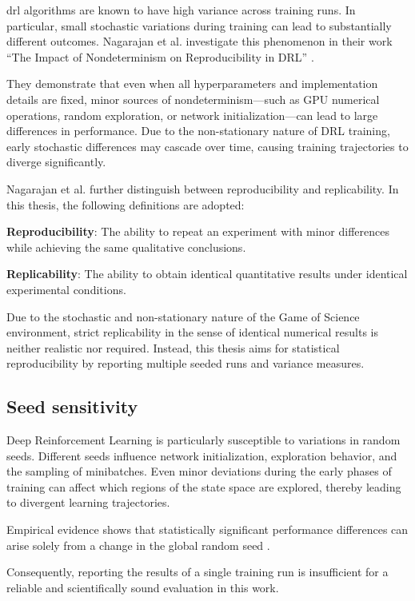 \documentclass[english,bachelor]{hsluthesis}
\begin{document}
\gls{drl} algorithms are known to have high variance across training runs. 
In particular, small stochastic variations during training can lead to substantially different outcomes. 
Nagarajan et al. investigate this phenomenon in their work “The Impact of Nondeterminism on Reproducibility in DRL” \cite{Nagarajan2018TheIO}. 

They demonstrate that even when all hyperparameters and implementation details are fixed, 
minor sources of nondeterminism—such as GPU numerical operations, random exploration, or network initialization—can lead to large differences in performance. 
Due to the non-stationary nature of DRL training, early stochastic differences may cascade over time, causing training trajectories to diverge significantly.

Nagarajan et al. further distinguish between reproducibility and replicability. 
In this thesis, the following definitions are adopted:

\textbf{Reproducibility}: The ability to repeat an experiment with minor differences while achieving the same qualitative conclusions.

\textbf{Replicability}: The ability to obtain identical quantitative results under identical experimental conditions.

Due to the stochastic and non-stationary nature of the Game of Science environment, strict replicability in the sense of identical numerical results is neither realistic nor required. Instead, this thesis aims for statistical reproducibility by reporting multiple seeded runs 
and variance measures.

\subsection{Seed sensitivity}

Deep Reinforcement Learning is particularly susceptible to variations in random seeds. 
Different seeds influence network initialization, exploration behavior, and the sampling of minibatches. 
Even minor deviations during the early phases of training can affect which regions of the state space are explored, thereby leading to divergent learning trajectories.

Empirical evidence shows that statistically significant performance differences can arise solely from a change in the global random seed \cite{Nagarajan2018TheIO}.

Consequently, reporting the results of a single training run is insufficient for a reliable and scientifically sound evaluation in this work.
\end{document}
